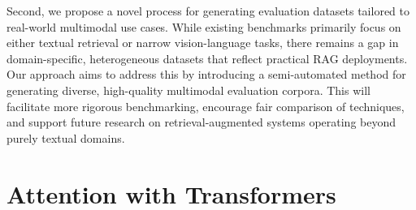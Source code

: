 \documentclass[12pt,twoside]{report}
\begin{document}
Second, we propose a novel process for generating evaluation datasets tailored to real-world multimodal use cases. While existing benchmarks primarily focus on either textual retrieval or narrow vision-language tasks, there remains a gap in domain-specific, heterogeneous datasets that reflect practical RAG deployments. Our approach aims to address this by introducing a semi-automated method for generating diverse, high-quality multimodal evaluation corpora. This will facilitate more rigorous benchmarking, encourage fair comparison of techniques, and support future research on retrieval-augmented systems operating beyond purely textual domains.



\section{Attention with Transformers}
\end{document}
